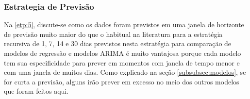 \subsubsection{Estrategia de Previs\~ao}\label{subsubsec:est}

Na \ref{etp:5}, discute-se como os dados foram previstos em uma janela de horizonte de previsão muito maior do que o habitual na literatura para a estratégia recursiva de 1, 7, 14 e 30 dias previstos nesta estratégia para comparação de modelos de regressão e modelos ARIMA é muito vantajosa porque cada modelo tem sua especificidade para prever em momentos com janela de tempo menor e com uma janela de muitos dias. Como explicado na seção \ref{subsubsec:modelos}, se for curta a previsão, alguns irão prever em excesso no meio dos outros modelos que foram feitos aqui.